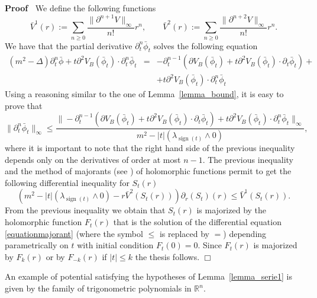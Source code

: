 \documentclass[a4paper,10pt]{article}
\newcommand{\assign}{:=}
\newcommand{\tmop}[1]{\ensuremath{\operatorname{#1}}}
\newenvironment{proof}{\noindent\textbf{Proof\ }}{\hspace*{\fill}$\Box$\medskip}
\begin{document}
\begin{proof}
  We define the following functions
  \[ \bar{V}^1 (r) \assign \sum_{n \geqslant 0} \frac{\| \partial^{n + 1} V
     \|_{\infty}}{n!} r^n, \qquad \bar{V}^2 (r) \assign \sum_{n \geqslant 0}
     \frac{\| \partial^{n + 2} V \|_{\infty}}{n!} r^n . \]
  We have that the partial derivative $\partial^n_t \bar{\phi}_t$ solves the
  following equation
  \begin{eqnarray}
    (m^2 - \Delta) \partial^n_t \bar{\phi} + t \partial^2 V_B (\bar{\phi}_t)
    \cdot \partial_t^n \bar{\phi}_t & = & - \partial^{n - 1}_t (\partial V_B
    (\bar{\phi}_t) + t \partial^2 V_B (\bar{\phi}_t) \cdot \partial_t
    \bar{\phi}_t) + \nonumber\\
    &  & + t \partial^2 V_B (\bar{\phi}_t) \cdot \partial_t^n \bar{\phi}_t
    \nonumber
  \end{eqnarray}
  Using a reasoning similar to the one of Lemma~\ref{lemma_bound}, it is easy
  to prove that
  \[ \| \partial^n_t \bar{\phi}_t \|_{\infty} \leqslant \frac{\| -
     \partial^{n - 1}_t (\partial V_B (\bar{\phi}_t) + t \partial^2 V_B
     (\bar{\phi}_t) \cdot \partial_t \bar{\phi}_t) + t \partial^2 V_B
     (\bar{\phi}_t) \cdot \partial_t^n \bar{\phi}_t \|_{\infty}}{m^2 - | t |
     (\lambda_{\tmop{sign} (t)} \wedge 0)}, \]
  where it is important to note that the right hand side of the previous
  inequality depends only on the derivatives of order at most $n - 1$. The
  previous inequality and the method of majorants (see
  {\cite{Van2003majorants}}) of holomorphic functions permit to get the
  following differential inequality for $S_t (r)$
  \begin{equation}
    (m^2 - | t | (\lambda_{\tmop{sign} (t)} \wedge 0) - r \bar{V}^2 (S_t (r)))
    \partial_r (S_t) (r) \leqslant \bar{V}^1 (S_t (r)) .
    \label{equationmajorant}
  \end{equation}
  From the previous inequality we obtain that $S_t (r)$ is majorized by the
  holomorphic function $F_t (r)$ that is the solution of the differential
  equation {\eqref{equationmajorant}} (where the symbol $\leqslant$ is
  replaced by $=$) depending parametrically on $t$ with initial condition $F_t
  (0) = 0$. Since $F_t (r)$ is majorized by $F_k (r)$ or by $F_{- k} (r)$ if
  $| t | \leqslant k$ the thesis follows. 
\end{proof}

\begin{remark}
  \label{remark_serie1}An example of potential satisfying the hypotheses of
  Lemma~\ref{lemma_serie1} is given by the family of trigonometric polynomials
  in $\mathbb{R}^n$.
\end{remark}
\end{document}

